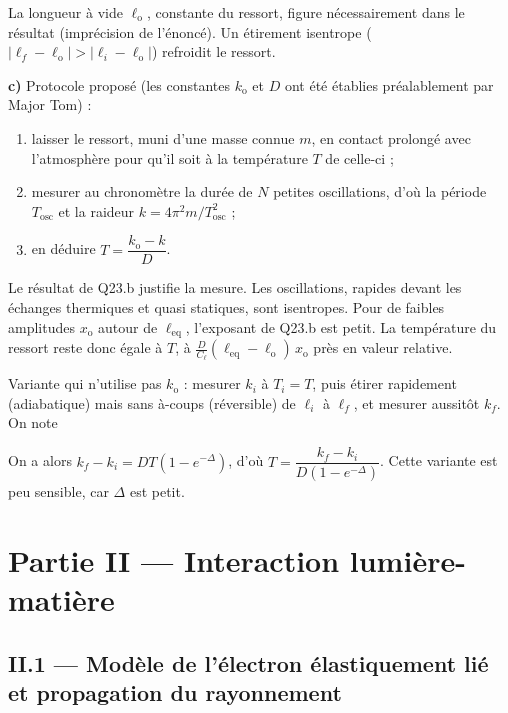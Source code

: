 \documentclass[11pt,a4paper]{article}
\providecommand{\tightlist}{\setlength{\itemsep}{0pt}\setlength{\parskip}{0pt}}
\newcommand{\equationajustee}[1]{%
  \sbox{\boiteequation}{$\displaystyle #1$}%
  \ifdim\wd\boiteequation>\linewidth
    \[\resizebox{\linewidth}{!}{\usebox{\boiteequation}}\]%
  \else
    \[#1\]%
  \fi}
\begin{document}
La longueur à vide \(\ell_{\mathrm{o}}\), constante du ressort, figure nécessairement dans le résultat (imprécision de l'énoncé). Un étirement isentrope (\(|\ell_f-\ell_{\mathrm{o}}|>|\ell_i-\ell_{\mathrm{o}}|\)) refroidit le ressort.

\textbf{c)} Protocole proposé (les constantes \(k_{\mathrm{o}}\) et \(D\) ont été établies préalablement par Major Tom) :

\begin{enumerate}
\def\labelenumi{\arabic{enumi}.}
\tightlist
\item
  laisser le ressort, muni d'une masse connue \(m\), en contact prolongé avec l'atmosphère pour qu'il soit à la température \(T\) de celle-ci ;
\item
  mesurer au chronomètre la durée de \(N\) petites oscillations, d'où la période \(T_{\text{osc}}\) et la raideur \(k=4\pi^2m/T_{\text{osc}}^2\) ;
\item
  en déduire \(\boxed{T=\dfrac{k_{\mathrm{o}}-k}{D}}\).
\end{enumerate}

Le résultat de Q23.b justifie la mesure. Les oscillations, rapides devant les échanges thermiques et quasi statiques, sont isentropes. Pour de faibles amplitudes \(x_{\mathrm{o}}\) autour de \(\ell_{\text{eq}}\), l'exposant de Q23.b est petit. La température du ressort reste donc égale à \(T\), à \(\frac{D}{C_\ell}(\ell_{\text{eq}}-\ell_{\mathrm{o}})\,x_{\mathrm{o}}\) près en valeur relative.

Variante qui n'utilise pas \(k_{\mathrm{o}}\) : mesurer \(k_i\) à \(T_i=T\), puis étirer rapidement (adiabatique) mais sans à-coups (réversible) de \(\ell_i\) à \(\ell_f\), et mesurer aussitôt \(k_f\). On note

\equationajustee{\Delta=\frac{D}{2C_\ell}\left[(\ell_f-\ell_{\mathrm{o}})^2-(\ell_i-\ell_{\mathrm{o}})^2\right]}

On a alors \(k_f-k_i=DT(1-e^{-\Delta})\), d'où \(T=\dfrac{k_f-k_i}{D(1-e^{-\Delta})}\). Cette variante est peu sensible, car \(\Delta\) est petit.

\hypertarget{partie-ii-interaction-lumiuxe8re-matiuxe8re}{%
\section{Partie II --- Interaction lumière-matière}\label{partie-ii-interaction-lumiuxe8re-matiuxe8re}}

\hypertarget{ii.1-moduxe8le-de-luxe9lectron-uxe9lastiquement-liuxe9-et-propagation-du-rayonnement}{%
\subsection{II.1 --- Modèle de l'électron élastiquement lié et propagation du rayonnement}\label{ii.1-moduxe8le-de-luxe9lectron-uxe9lastiquement-liuxe9-et-propagation-du-rayonnement}}
\end{document}
